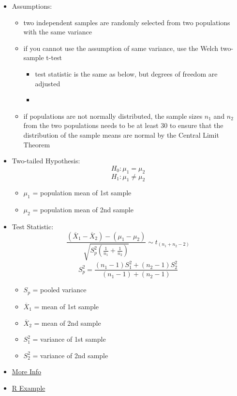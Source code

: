 \documentclass[]{book}
\providecommand{\tightlist}{%
  \setlength{\itemsep}{0pt}\setlength{\parskip}{0pt}}
\begin{document}
\begin{itemize}
\item
  Assumptions:

  \begin{itemize}
  \tightlist
  \item
    two independent samples are randomly selected from two populations with the same variance
  \item
    if you cannot use the assumption of same variance, use the Welch two-sample t-test

    \begin{itemize}
    \item
      test statistic is the same as below, but degrees of freedom are adjusted
    \item
    \end{itemize}
  \item
    if populations are not normally distributed, the sample sizes \(n_1\) and \(n_2\) from the two populations needs to be at least 30 to ensure that the distribution of the sample means are normal by the Central Limit Theorem
  \end{itemize}
\item
  Two-tailed Hypothesis:
  \[ H_0: \mu_1 = \mu_2 \]
  \[ H_1: \mu_1 \neq \mu_2 \]

  \begin{itemize}
  \tightlist
  \item
    \(\mu_1\) = population mean of 1st sample
  \item
    \(\mu_2\) = population mean of 2nd sample
  \end{itemize}
\item
  Test Statistic:
  \[ \frac{ (\overline{X}_1-\overline{X}_2) - (\mu_1 - \mu_2) }{ \sqrt{S_p^2 \left( \frac{1}{n_1} + \frac{1}{n_2} \right) } } \sim t_{(n_1 + n_2 -2)} \]
  \[ S_p^2 = \frac{(n_1-1)S_1^2 + (n_2-1)S_2^2}{(n_1-1)+(n_2-1)} \]

  \begin{itemize}
  \tightlist
  \item
    \(S_p\) = pooled variance
  \item
    \(\overline{X}_1\) = mean of 1st sample
  \item
    \(\overline{X}_2\) = mean of 2nd sample
  \item
    \(S_1^2\) = variance of 1st sample
  \item
    \(S_2^2\) = variance of 2nd sample
  \end{itemize}
\item
  \href{http://www.biostathandbook.com/twosamplettest.html}{More Info}
\item
  \href{https://rcompanion.org/rcompanion/d_02.html}{R Example}


\end{itemize}
\end{document}
